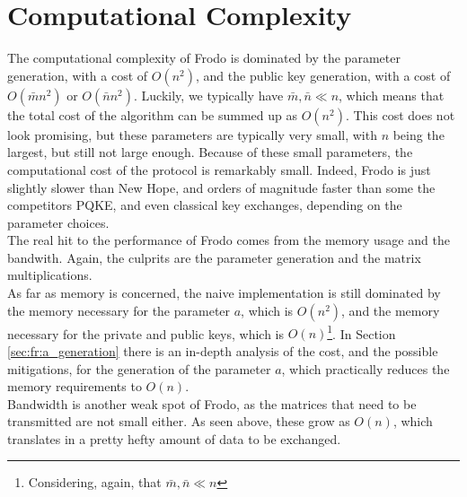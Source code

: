 \section{Computational Complexity}
The computational complexity of Frodo is dominated by the parameter generation, with a cost of $O(n^2)$, and the public key generation, with a cost of $O(\bar{m}n^2)$ or $O(\bar{n}n^2)$. Luckily, we typically have $\bar{m},\bar{n} \ll n$, which means that the total cost of the algorithm can be summed up as $O(n^2)$. This cost does not look promising, but these parameters are typically very small, with $n$ being the largest, but still not large enough. Because of these small parameters, the computational cost of the protocol is remarkably small. Indeed, Frodo is just slightly slower than New Hope, and orders of magnitude faster than some the competitors PQKE, and even classical key exchanges, depending on the parameter choices.\\
The real hit to the performance of Frodo comes from the memory usage and the bandwith. Again, the culprits are the parameter generation and the matrix multiplications.\\
As far as memory is concerned, the naive implementation is still dominated by the memory necessary for the parameter $a$, which is $O(n^2)$, and the memory necessary for the private and public keys, which is $O(n)$\footnote{Considering, again, that $\bar{m},\bar{n} \ll n$}. In Section \ref{sec:fr:a_generation} there is an in-depth analysis of the cost, and the possible mitigations, for the generation of the parameter $a$, which practically reduces the memory requirements to $O(n)$.\\
Bandwidth is another weak spot of Frodo, as the matrices that need to be transmitted are not small either. As seen above, these grow as $O(n)$, which translates in a pretty hefty amount of data to be exchanged.\\

